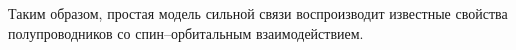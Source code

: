Таким образом, простая модель сильной связи воспроизводит известные свойства 
полупроводников со спин--орбитальным взаимодействием.

%


